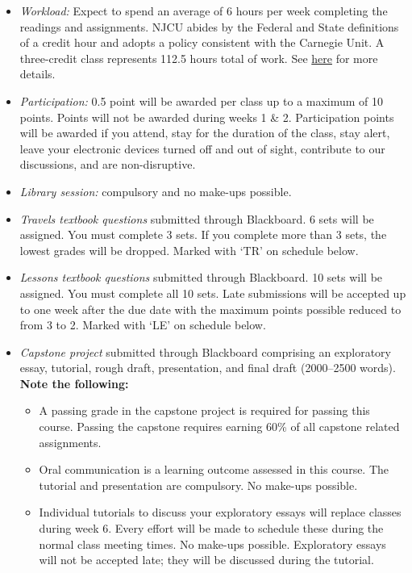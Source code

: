 \documentclass[article,oneside]{memoir}
\begin{document}
\begin{itemize}
\item \textit{Workload:} Expect to spend an average of 6 hours per week completing the readings and assignments. NJCU abides by the Federal and State definitions of a credit hour and adopts a policy consistent with the Carnegie Unit. A three-credit class represents 112.5 hours total of work. See \href{http://scottoconnor.org/resources/Credit.pdf}{here} for more details.


\item \textit{Participation:}  0.5 point will be awarded per class up to a maximum of 10 points. Points will not be awarded during weeks 1 \& 2. Participation points will be awarded if you attend, stay for the duration of the class, stay alert, leave your electronic devices turned off and out of sight, contribute to our discussions, and are non-disruptive. 

\item \textit{Library session:} compulsory and no make-ups possible. 

\item \textit{Travels textbook questions} submitted through Blackboard. 6 sets will be assigned. You must complete 3 sets. If you complete more than 3 sets, the lowest grades will be dropped.  Marked with `TR' on schedule below. 


\item \textit{Lessons textbook questions} submitted through Blackboard. 10 sets will be assigned. You must complete all 10 sets. Late submissions will be accepted up to one week after the due date with the maximum points possible reduced to from 3 to 2. Marked with `LE' on schedule below. 
 
\item \textit{Capstone project} submitted through Blackboard comprising an exploratory essay, tutorial, rough draft, presentation, and final draft (2000--2500 words). \textbf{Note the following:} 
\begin{itemize} 
\item A passing grade in the capstone project is required for passing this course. Passing the capstone requires earning 60\% of all capstone related assignments.
\item Oral communication is a learning outcome assessed in this course. The tutorial and presentation are compulsory. No make-ups possible.
\item Individual tutorials to discuss your exploratory essays will replace classes during week 6. Every effort will be made to schedule these during the normal class meeting times. No make-ups possible. Exploratory essays will not be accepted late; they will be discussed during the tutorial.
\end{itemize}



\end{itemize}
\end{document}
